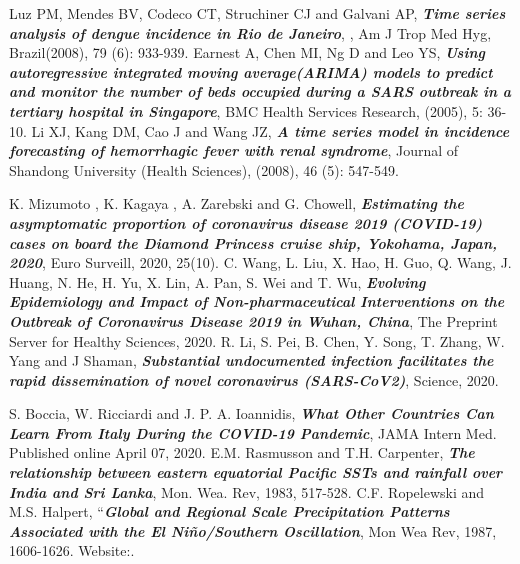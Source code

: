 \documentclass[notheorems,envcountsect,hyperref=unicode]{beamer}
\begin{document}
\begin{frame}
\begin{thebibliography}{99}	
	 Luz PM, Mendes BV, Codeco CT, Struchiner CJ and Galvani AP, \textbf{\textit{Time series analysis of dengue incidence in Rio de Janeiro}}, , Am J Trop Med Hyg, Brazil(2008), 79 (6): 933-939.
	 Earnest A, Chen MI, Ng D and Leo YS, \textbf{\textit{Using autoregressive integrated moving average(ARIMA) models to predict and monitor the number of beds occupied during a SARS outbreak in a tertiary hospital in Singapore}}, BMC Health Services Research, (2005), 5: 36-10.
	  Li XJ, Kang DM, Cao J and Wang JZ, \textbf{\textit{A time series model in incidence forecasting of hemorrhagic fever with renal syndrome}}, Journal of Shandong University (Health Sciences), (2008), 46 (5): 547-549.
\end{thebibliography}	
\end{frame}

\begin{frame}
\begin{thebibliography}{99}
	  K. Mizumoto , K. Kagaya , A. Zarebski and G. Chowell, \textbf{\textit{Estimating the asymptomatic proportion of coronavirus disease 2019 (COVID-19) cases on board the Diamond Princess cruise ship, Yokohama, Japan, 2020}},  Euro Surveill, 2020, 25(10).
     C. Wang, L. Liu, X. Hao, H. Guo, Q. Wang, J. Huang, N. He, H. Yu, X. Lin, A. Pan, S. Wei and T. Wu, \textbf{\textit{Evolving Epidemiology and Impact of Non-pharmaceutical Interventions on the Outbreak of Coronavirus Disease 2019 in Wuhan, China}}, The Preprint Server for Healthy Sciences, 2020.
     R. Li, S. Pei, B. Chen, Y. Song, T. Zhang, W. Yang and J Shaman, \textbf{\textit{Substantial undocumented infection facilitates the rapid dissemination of novel coronavirus (SARS-CoV2)}}, Science, 2020.
\end{thebibliography}	
\end{frame}

\begin{frame}
	\begin{thebibliography}{99}
	 S. Boccia, W. Ricciardi and J. P. A. Ioannidis, \textbf{\textit{What Other Countries Can Learn From Italy During the COVID-19 Pandemic}}, JAMA Intern Med. Published online April 07, 2020. 
	 E.M. Rasmusson and T.H. Carpenter, \textbf{\textit{The relationship between eastern equatorial Pacific SSTs and rainfall over India and Sri Lanka}}, Mon. Wea. Rev, 1983, 517-528.
	 C.F. Ropelewski and M.S. Halpert, “\textbf{\textit{Global and Regional Scale Precipitation Patterns Associated with the El Niño/Southern Oscillation}}, Mon Wea Rev, 1987, 1606-1626.
	 Website:.
\end{thebibliography}	
\end{frame}

\begin{frame}
\centerline{\Large\bf \fontsize{18}{18}\selectfont{\color{red}{KẾT THÚC BÁO CÁO}}}
\vspace{1cm}
\centerline{\Large\bf \fontsize{23}{18}\selectfont{\color{blue}{TRÂN TRỌNG CẢM ƠN!}}}
\end{frame}
\end{document}
